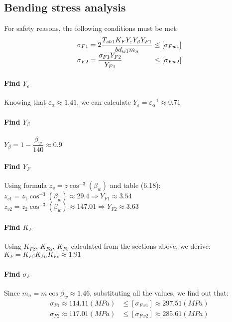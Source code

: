 \subsection{Bending stress analysis}
For safety reasons, the following conditions must be met:
\[
\begin{array}{l@{{} \leq {}}l}
\sigma_{F1} = 2\dfrac{T_{sh1}K_FY_\varepsilon Y_\beta Y_{F1}}{bd_{w1}m_n} & [\sigma_{Fw1}]\\ 
\sigma_{F2} = \dfrac{\sigma_{F1}Y_{F2}}{Y_{F1}} & [\sigma_{Fw2}]
\end{array}
\]

\paragraph{Find $ Y_\varepsilon $} Knowing that $ \varepsilon_\alpha \approx 1.41 $, we can calculate $ Y_\varepsilon = \varepsilon_\alpha^{-1} \approx 0.71 $
\paragraph{Find $ Y_\beta $} $ Y_\beta = 1-\dfrac{\beta_w}{140}\approx0.9$
\paragraph{Find $ Y_F $} Using formula $ z_v = z\cos^{-3}(\beta_w) $ and table (6.18):\\
$ z_{v1} = z_1\cos^{-3}(\beta_w) \approx 29.4 \Rightarrow Y_{F1} \approx 3.54$\\
$ z_{v2} = z_2\cos^{-3}(\beta_w) \approx 147.01 \Rightarrow Y_{F2} \approx 3.63 $
\paragraph{Find $ K_F $}
Using $ K_{F\beta} $, $ K_{F\alpha} $, $ K_{Fv} $ calculated from the sections above, we derive:\\ $ K_F = K_{F\beta}K_{F\alpha}K_{Fv} \approx 1.91 $

\paragraph{Find $ \sigma_F $} Since $ m_n = m\cos\beta_w \approx 1.46$, substituting all the values, we find out that:
\begin{align*}
\sigma_{F1} \approx 114.11 \unit{(MPa)} & \leq [\sigma_{Fw1}]\approx 297.51 \unit{(MPa)}\\
\sigma_{F2} \approx 117.01 \unit{(MPa)} & \leq [\sigma_{Fw2}]\approx 285.61 \unit{(MPa)}
\end{align*}

